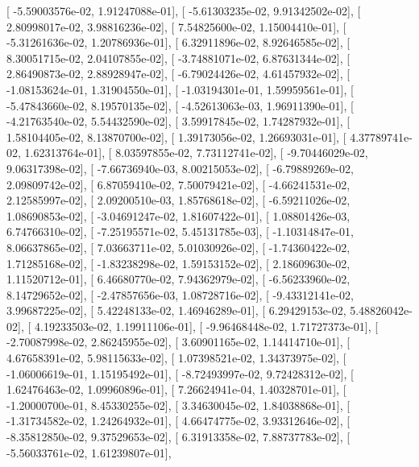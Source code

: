 \documentclass{article}
\begin{document}
       [ -5.59003576e-02,   1.91247088e-01],
       [ -5.61303235e-02,   9.91342502e-02],
       [  2.80998017e-02,   3.98816236e-02],
       [  7.54825600e-02,   1.15004410e-01],
       [ -5.31261636e-02,   1.20786936e-01],
       [  6.32911896e-02,   8.92646585e-02],
       [  8.30051715e-02,   2.04107855e-02],
       [ -3.74881071e-02,   6.87631344e-02],
       [  2.86490873e-02,   2.88928947e-02],
       [ -6.79024426e-02,   4.61457932e-02],
       [ -1.08153624e-01,   1.31904550e-01],
       [ -1.03194301e-01,   1.59959561e-01],
       [ -5.47843660e-02,   8.19570135e-02],
       [ -4.52613063e-03,   1.96911390e-01],
       [ -4.21763540e-02,   5.54432590e-02],
       [  3.59917845e-02,   1.74287932e-01],
       [  1.58104405e-02,   8.13870700e-02],
       [  1.39173056e-02,   1.26693031e-01],
       [  4.37789741e-02,   1.62313764e-01],
       [  8.03597855e-02,   7.73112741e-02],
       [ -9.70446029e-02,   9.06317398e-02],
       [ -7.66736940e-03,   8.00215053e-02],
       [ -6.79889269e-02,   2.09809742e-02],
       [  6.87059410e-02,   7.50079421e-02],
       [ -4.66241531e-02,   2.12585997e-02],
       [  2.09200510e-03,   1.85768618e-02],
       [ -6.59211026e-02,   1.08690853e-02],
       [ -3.04691247e-02,   1.81607422e-01],
       [  1.08801426e-03,   6.74766310e-02],
       [ -7.25195571e-02,   5.45131785e-03],
       [ -1.10314847e-01,   8.06637865e-02],
       [  7.03663711e-02,   5.01030926e-02],
       [ -1.74360422e-02,   1.71285168e-02],
       [ -1.83238298e-02,   1.59153152e-02],
       [  2.18609630e-02,   1.11520712e-01],
       [  6.46680770e-02,   7.94362979e-02],
       [ -6.56233960e-02,   8.14729652e-02],
       [ -2.47857656e-03,   1.08728716e-02],
       [ -9.43312141e-02,   3.99687225e-02],
       [  5.42248133e-02,   1.46946289e-01],
       [  6.29429153e-02,   5.48826042e-02],
       [  4.19233503e-02,   1.19911106e-01],
       [ -9.96468448e-02,   1.71727373e-01],
       [ -2.70087998e-02,   2.86245955e-02],
       [  3.60901165e-02,   1.14414710e-01],
       [  4.67658391e-02,   5.98115633e-02],
       [  1.07398521e-02,   1.34373975e-02],
       [ -1.06006619e-01,   1.15195492e-01],
       [ -8.72493997e-02,   9.72428312e-02],
       [  1.62476463e-02,   1.09960896e-01],
       [  7.26624941e-04,   1.40328701e-01],
       [ -1.20000700e-01,   8.45330255e-02],
       [  3.34630045e-02,   1.84038868e-01],
       [ -1.31734582e-02,   1.24264932e-01],
       [  4.66474775e-02,   3.93312646e-02],
       [ -8.35812850e-02,   9.37529653e-02],
       [  6.31913358e-02,   7.88737783e-02],
       [ -5.56033761e-02,   1.61239807e-01],
\end{document}
